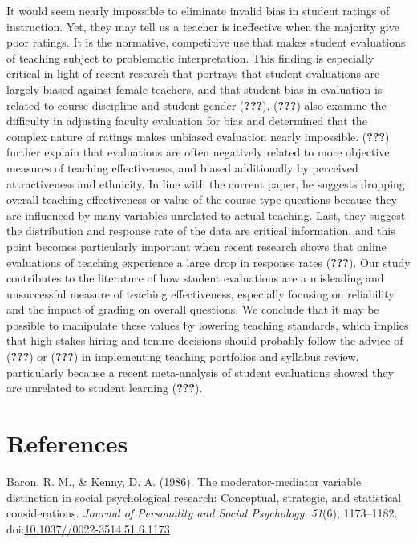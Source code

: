 \documentclass[man]{apa6}
\theoremstyle{definition}
\theoremstyle{definition}
\theoremstyle{definition}
\theoremstyle{remark}
\begin{document}
It would seem nearly impossible to eliminate invalid bias in student
ratings of instruction. Yet, they may tell us a teacher is ineffective
when the majority give poor ratings. It is the normative, competitive
use that makes student evaluations of teaching subject to problematic
interpretation. This finding is especially critical in light of recent
research that portrays that student evaluations are largely biased
against female teachers, and that student bias in evaluation is related
to course discipline and student gender ({\textbf{???}}).
({\textbf{???}}) also examine the difficulty in adjusting faculty
evaluation for bias and determined that the complex nature of ratings
makes unbiased evaluation nearly impossible. ({\textbf{???}}) further
explain that evaluations are often negatively related to more objective
measures of teaching effectiveness, and biased additionally by perceived
attractiveness and ethnicity. In line with the current paper, he
suggests dropping overall teaching effectiveness or value of the course
type questions because they are influenced by many variables unrelated
to actual teaching. Last, they suggest the distribution and response
rate of the data are critical information, and this point becomes
particularly important when recent research shows that online
evaluations of teaching experience a large drop in response rates
({\textbf{???}}). Our study contributes to the literature of how student
evaluations are a misleading and unsuccessful measure of teaching
effectiveness, especially focusing on reliability and the impact of
grading on overall questions. We conclude that it may be possible to
manipulate these values by lowering teaching standards, which implies
that high stakes hiring and tenure decisions should probably follow the
advice of ({\textbf{???}}) or ({\textbf{???}}) in implementing teaching
portfolios and syllabus review, particularly because a recent
meta-analysis of student evaluations showed they are unrelated to
student learning ({\textbf{???}}).

\newpage

\hypertarget{references}{%
\section{References}\label{references}}

\setlength{\parindent}{-0.5in}
\setlength{\leftskip}{0.5in}

\hypertarget{refs}{}
\leavevmode\hypertarget{ref-Baron1986}{}%
Baron, R. M., \& Kenny, D. A. (1986). The moderator-mediator variable
distinction in social psychological research: Conceptual, strategic, and
statistical considerations. \emph{Journal of Personality and Social
Psychology}, \emph{51}(6), 1173--1182.
doi:\href{https://doi.org/10.1037//0022-3514.51.6.1173}{10.1037//0022-3514.51.6.1173}
\end{document}
